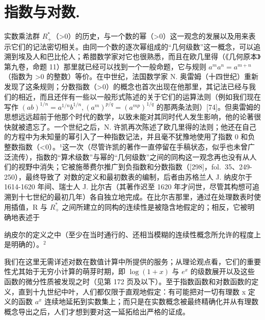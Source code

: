 \chapter{指数与对数.}

实数乘法群 \(R_{+}^{*}\)（\textgreater0）的历史，与一个数的幂（\textgreater0）这一观念的发展以及用来表示它们的记法密切相关。由同一个数的逐次幂组成的“几何级数”这一概念，可以追溯到埃及人和巴比伦人；希腊数学家对它也很熟悉，而且在欧几里得（《几何原本》第九卷，命题 11）那里就已经可以找到一个一般命题，它与规则 \(a^{m}a^{n}=a^{m+n}\)（指数为 \textgreater0 的整数）等价。在中世纪，法国数学家 N. 奥雷姆（十四世纪）重新发现了这条规则；分数指数（\textgreater0）的概念也首次出现在他那里，其记法已经与我们的相近，而且还伴有一些以一般形式陈述的关于它们的运算法则（例如我们现在写作 \((ab)^{1/n}=a^{1/n}b^{1/n},(a^{m})^{p/q}=(a^{mp})^{1/q}\) 的那两条法则）{[}74{]}。但奥雷姆的思想远远超前于他那个时代的数学，以致未能对其同时代人发生影响，他的论著很快就被遗忘了。一个世纪之后，N. 许凯再次陈述了欧几里得的法则；他还在自己的方程中为未知量的幂引入了一种指数记法，并且毫不犹豫地使用了指数 0 和负整数指数（\textless0）。¹这一次（尽管许凯的著作一直停留在手稿状态，似乎也未曾广泛流传），指数的“算术级数”与幂的“几何级数”之间的同构这一观念再也没有从人们的视野中消失；它被施蒂费尔推广到负指数和分数指数（{[}298{]}，fol.~35、249-250），最终导致了 对数的定义和最初数表的编制，后者由苏格兰人 J. 纳皮尔于 1614-1620 年间、瑞士人 J. 比尔吉（其著作迟至 1620 年才问世，尽管其构想可追溯到十七世纪的最初几年）各自独立地完成。在比尔吉那里，通过在处理数表时使用插值，R 与 \(R_{+}^{*}\) 之间所建立的同构的连续性是被隐含地假定的；相反，它被明确地表述于

纳皮尔的定义之中（至少在当时通行的、还相当模糊的连续性概念所允许的程度上是明确的）。\(^{2}\)

我们在这里无需详述对数在数值计算中所提供的服务；从理论观点看，它们的重要性尤其始于无穷小计算的萌芽时期，即 \(\log(1+x)\) 与 \(e^{x}\) 的级数展开以及这些函数的微分性质被发现之时（见第 172 页及以下）。至于指数函数和对数函数的定义，直到十九世纪中叶，人们都仅限于直观地假定：有可能把对一切有理数 x 定义的函数 \(a^{x}\) 连续地延拓到实数集上；而只是在实数概念被最终精确化并从有理数概念导出之后，人们才想到要对这一延拓给出严格的证成。

